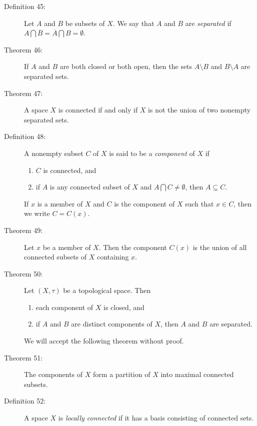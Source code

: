\documentclass{article}
\begin{document}
\begin{description}
  \item[Definition 45:] Let $A$ and $B$ be subsets of $X$. We say that $A$ and $B$ are \emph{separated} if $A \bigcap \overline{B} = \overline{A} \bigcap B = \emptyset$.

  \item[Theorem 46:] If $A$ and $B$ are both closed or both open, then the sets $A \setminus B$ and $B \setminus A$ are separated sets.

  \item[Theorem 47:] A space $X$ is connected if and only if $X$ is not the union of two nonempty separated sets.

  \item[Definition 48:] A nonempty subset $C$ of $X$ is said to be a \emph{component} of $X$ if
    \begin{enumerate}[\hspace{1cm}1.]
      \item $C$ is connected, and
      \item if $A$ is any connected subset of $X$ and $A \bigcap C \neq \emptyset$, then $A \subseteq C$.
    \end{enumerate}
    If $x$ is a member of $X$ and $C$ is the component of $X$ such that $x \in C$, then we write $C=C(x)$.

  \item[Theorem 49:] Let $x$ be a member of $X$. Then the component $C(x)$ is the union of all connected subsets of $X$ containing $x$.

  \item[Theorem 50:] Let $(X, \tau)$ be a topological space. Then
    \begin{enumerate}[\hspace{1cm}1.]
      \item each component of $X$ is closed, and
      \item if $A$ and $B$ are distinct components of $X$, then $A$ and $B$ are separated.
    \end{enumerate}

  \item[] We will accept the following theorem without proof.

  \item[Theorem 51:] The components of $X$ form a partition of $X$ into maximal connected subsets.

  \item[Definition 52:] A space $X$ is \emph{locally connected} if it has a basis consisting of connected sets.


\end{description}
\end{document}
